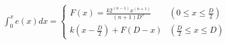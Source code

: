 \documentclass[
  11pt,
  border=2,
  convert={
    density=100 -alpha remove,
    outext=.png
  },
]{standalone}
\begin{document}
$
  \displaystyle \int_0^x e(x) dx = \begin{cases}
    \displaystyle F(x) = \frac{k2^{(n-1)}x^{(n+1)}}{(n+1)D^n}
      & \left(0 \leq x \leq \frac{D}{2}\right)
    \\
    \displaystyle k\left(x - \frac{D}{2}\right) + F(D-x)
      & \left(\frac{D}{2} \leq x \leq D\right)
  \end{cases}
$
\end{document}
